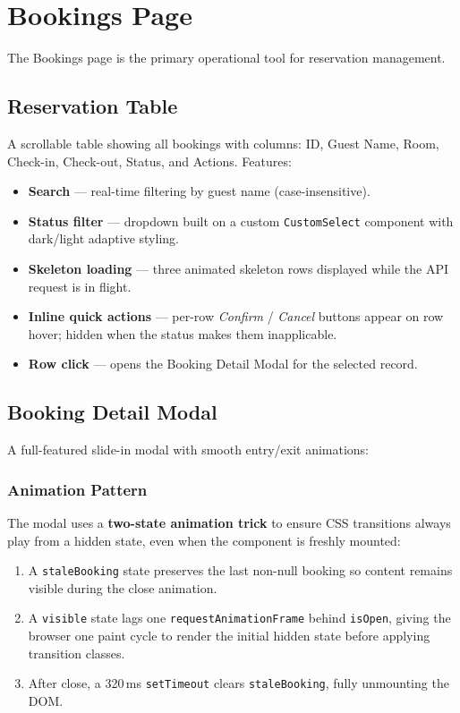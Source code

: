 \documentclass[12pt,a4paper]{report}
\begin{document}
\section{Bookings Page}

The Bookings page is the primary operational tool for reservation management.

\subsection{Reservation Table}

A scrollable table showing all bookings with columns: ID, Guest Name, Room,
Check-in, Check-out, Status, and Actions. Features:

\begin{itemize}[leftmargin=2em]
  \item \textbf{Search} — real-time filtering by guest name (case-insensitive).
  \item \textbf{Status filter} — dropdown built on a custom \texttt{CustomSelect}
        component with dark/light adaptive styling.
  \item \textbf{Skeleton loading} — three animated skeleton rows displayed
        while the API request is in flight.
  \item \textbf{Inline quick actions} — per-row \emph{Confirm} / \emph{Cancel}
        buttons appear on row hover; hidden when the status makes them
        inapplicable.
  \item \textbf{Row click} — opens the Booking Detail Modal for the selected
        record.
\end{itemize}

\subsection{Booking Detail Modal}

A full-featured slide-in modal with smooth entry/exit animations:

\subsubsection{Animation Pattern}

The modal uses a \textbf{two-state animation trick} to ensure CSS transitions
always play from a hidden state, even when the component is freshly mounted:

\begin{enumerate}[leftmargin=2em]
  \item A \texttt{staleBooking} state preserves the last non-null booking so
        content remains visible during the close animation.
  \item A \texttt{visible} state lags one \texttt{requestAnimationFrame} behind
        \texttt{isOpen}, giving the browser one paint cycle to render the
        initial hidden state before applying transition classes.
  \item After close, a 320\,ms \texttt{setTimeout} clears \texttt{staleBooking},
        fully unmounting the DOM.
\end{enumerate}
\end{document}
